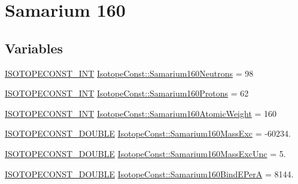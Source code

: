 \hypertarget{group___isotope_const-_samarium-_sm160}{}\section{Samarium 160}
\label{group___isotope_const-_samarium-_sm160}
\subsection*{Variables}
\begin{DoxyCompactItemize}
\item 
\mbox{\hyperlink{group___isotope_const-_macros_ga5f18360b3e99483a35c32d789e62621c}{I\+S\+O\+T\+O\+P\+E\+C\+O\+N\+S\+T\+\_\+\+I\+NT}} \mbox{\hyperlink{group___isotope_const-_samarium-_sm160_gaefd775f302f0375d7a118f1a47901a76}{Isotope\+Const\+::\+Samarium160\+Neutrons}} = 98
\item 
\mbox{\hyperlink{group___isotope_const-_macros_ga5f18360b3e99483a35c32d789e62621c}{I\+S\+O\+T\+O\+P\+E\+C\+O\+N\+S\+T\+\_\+\+I\+NT}} \mbox{\hyperlink{group___isotope_const-_samarium-_sm160_ga953046c9139b5140259835b1c81399ae}{Isotope\+Const\+::\+Samarium160\+Protons}} = 62
\item 
\mbox{\hyperlink{group___isotope_const-_macros_ga5f18360b3e99483a35c32d789e62621c}{I\+S\+O\+T\+O\+P\+E\+C\+O\+N\+S\+T\+\_\+\+I\+NT}} \mbox{\hyperlink{group___isotope_const-_samarium-_sm160_ga2d4b09d1b7f31d3700f7b19580339385}{Isotope\+Const\+::\+Samarium160\+Atomic\+Weight}} = 160
\item 
\mbox{\hyperlink{group___isotope_const-_macros_ga8f45a7272ce02c0b4c65c44636ed719a}{I\+S\+O\+T\+O\+P\+E\+C\+O\+N\+S\+T\+\_\+\+D\+O\+U\+B\+LE}} \mbox{\hyperlink{group___isotope_const-_samarium-_sm160_gaa7de849a4de275bea701cf8bae7808f9}{Isotope\+Const\+::\+Samarium160\+Mass\+Exc}} = -\/60234.
\item 
\mbox{\hyperlink{group___isotope_const-_macros_ga8f45a7272ce02c0b4c65c44636ed719a}{I\+S\+O\+T\+O\+P\+E\+C\+O\+N\+S\+T\+\_\+\+D\+O\+U\+B\+LE}} \mbox{\hyperlink{group___isotope_const-_samarium-_sm160_ga2c669b1435e91afeb83430912220b146}{Isotope\+Const\+::\+Samarium160\+Mass\+Exc\+Unc}} = 5.
\item 
\mbox{\hyperlink{group___isotope_const-_macros_ga8f45a7272ce02c0b4c65c44636ed719a}{I\+S\+O\+T\+O\+P\+E\+C\+O\+N\+S\+T\+\_\+\+D\+O\+U\+B\+LE}} \mbox{\hyperlink{group___isotope_const-_samarium-_sm160_ga6a6e8fa61eb46edb8f0f1ed4ee247abd}{Isotope\+Const\+::\+Samarium160\+Bind\+E\+PerA}} = 8144.
\item 

\end{DoxyCompactItemize}
